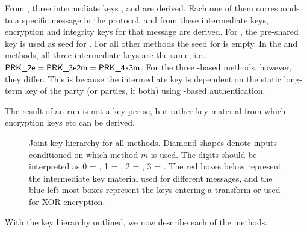 From \mGxy{}, three intermediate keys \mPRKtwo, \mPRKthree{} and
\mPRKthree{} are derived.
%
Each one of them corresponds to a specific message in the protocol, and from these intermediate keys, encryption and integrity keys for that message are derived.
%
For \mPskPsk{}, the pre-shared key is used as seed for \mPRKtwo. For all other methods the seed for \mPRKtwo{} is empty.
%
In the \mPskPsk{} and \mSigSig{} methods, all three intermediate keys
are the same, i.e., $\text{\textup{\textsf{PRK\_2e}}}{} = \text{\textup{\textsf{PRK\_3e2m}}}{} = \text{\textup{\textsf{PRK\_4x3m}}}$.
%
For the three \mStat-based methods, however, they differ. This is because the intermediate key \mPRKthree{} is dependent on the static long-term key of the party (or parties, if both) using \mStat{}-based authentication.
%

The result of an \mEdhoc{} run is not a key per se, but rather key material from which encryption keys etc can be derived.

%


\begin{figure}[!h]
\centering
\scalebox{.75}{

}
\caption{Joint key hierarchy for all methods. Diamond shapes denote inputs conditioned on which method $m$ is used. The digits should be
interpreted as 0 = \mSigSig, 1 = \mSigStat, 2 = \mStatSig, 3 = \mStatStat.
The red boxes below \mGxy{} represent the intermediate key material used for different messages, and the blue left-most boxes represent the keys entering a \mAead{} transform or used for XOR encryption.}
\label{fig:kdfdiagram}
\end{figure}

With the key hierarchy outlined, we now describe each of the \mEdhoc{} methods.
%
%
%

